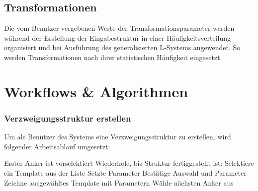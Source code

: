 \subsection*{Transformationen}
Die vom Benutzer vergebenen Werte der Transformationsparameter werden während der Erstellung der Eingabestruktur in
einer Häufigkeitsverteilung organisiert und bei Ausführung des generalisierten L-Systems angewendet.
So werden Transformationen nach ihrer statistischen Häufigkeit eingesetzt.

\newpage

\section{Workflows \& Algorithmen}
\label{algo}

\subsubsection*{Verzweigungsstruktur erstellen}
Um als Benutzer des Systems eine Verzweigungsstruktur zu erstellen, wird folgender Arbeitsablauf umgesetzt:
\begin{algorithm}[caption={Erstellen einer Verzweigungsstruktur}, label={alg1}]
    Erster Anker ist vorselektiert
    Wiederhole, bis Struktur fertiggestellt ist:
        Selektiere ein Template aus der Liste
        Setzte Parameter
        Bestätige Auswahl und Parameter
        Zeichne ausgewähltes Template mit Parametern
        Wähle nächsten Anker aus
\end{algorithm}


